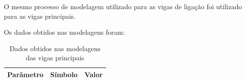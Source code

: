 O mesmo processo de modelagem utilizado para as vigas de ligação foi utilizado para as vigas principais.

Os dados obtidos nas modelagens foram:

\begin{table}[H]
  \centering
  \caption{Dados obtidos nas modelagens das vigas principais}
  \label{tab:dados_modelagens_vigas_principais}
  \begin{tabularx}{\textwidth}{>{\centering\arraybackslash}X>{\centering\arraybackslash}X>{\centering\arraybackslash}X}
    \toprule
    Parâmetro & Símbolo & Valor \\
    \midrule
    \bottomrule
  \end{tabularx}
\end{table}


